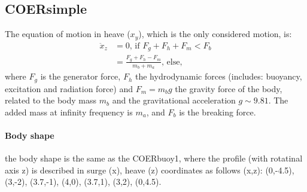 \documentclass[oneside,10pt,a4paper]{book}
\begin{document}
\subsection{COERsimple}
The equation of motion in heave ($x_y$), which is the only considered motion, is:
\begin{align}\label{eq:COERsimple}
\ddot{x}_z&=0\text{, if }F_g+F_h+F_m<F_b \\
	&=\frac{F_g+F_h-F_m}{m_b+m_a}\text{, else,} 
\end{align}
where $F_g$ is the generator force, $F_h$ the hydrodynamic forces (includes: buoyancy, excitation and radiation force) and $F_m=m_b g$ the gravity force of the body, related to the body mass $m_b$ and the gravitational acceleration $g\sim9.81$. The added mass at infinity frequency is $m_a$, and $F_b$ is the breaking force.
\paragraph{Body shape}
the body shape is the same as the COERbuoy1, where the profile (with rotatinal axis z) is described in surge (x), heave (z) coordinates as follows (x,z): (0,-4.5), (3,-2), (3.7,-1), (4,0), (3.7,1), (3,2), (0,4.5).
 
 
\end{document}
